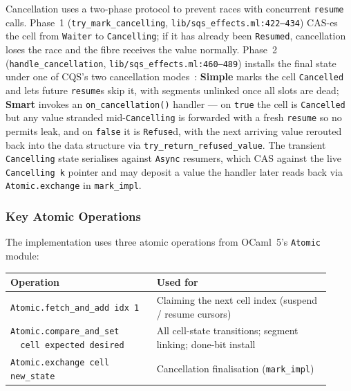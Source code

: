 \documentclass[11pt,a4paper]{article}
\begin{document}
Cancellation uses a two-phase protocol to prevent races with concurrent
\texttt{resume} calls. Phase~1 (\texttt{try\_mark\_cancelling},
\texttt{lib/sqs\_effects.ml:422--434}) CAS-es the cell from
\texttt{Waiter} to \texttt{Cancelling}; if it has already been
\texttt{Resumed}, cancellation loses the race and the fibre receives
the value normally. Phase~2 (\texttt{handle\_cancellation},
\texttt{lib/sqs\_effects.ml:460--489}) installs the final state under
one of CQS's two cancellation modes~\cite{koval2023cqs}: \textbf{Simple}
marks the cell \texttt{Cancelled} and lets future \texttt{resume}s skip
it, with segments unlinked once all slots are dead; \textbf{Smart}
invokes an \texttt{on\_cancellation()} handler --- on \texttt{true} the
cell is \texttt{Cancelled} but any value stranded mid-\texttt{Cancelling}
is forwarded with a fresh \texttt{resume} so no permits leak, and on
\texttt{false} it is \texttt{Refuse}d, with the next arriving value
rerouted back into the data structure via
\texttt{try\_return\_refused\_value}. The transient \texttt{Cancelling}
state serialises against \texttt{Async} resumers, which CAS against the
live \texttt{Cancelling~k} pointer and may deposit a value the handler
later reads back via \texttt{Atomic.exchange} in \texttt{mark\_impl}.

\subsubsection{Key Atomic Operations}
\label{sec:impl-atomics}

The implementation uses three atomic operations from OCaml~5's
\texttt{Atomic} module:

\begin{center}\small
\begin{tabular}{@{}p{0.42\linewidth}p{0.50\linewidth}@{}}
\toprule
\textbf{Operation} & \textbf{Used for} \\
\midrule
\texttt{Atomic.fetch\_and\_add idx 1}
  & Claiming the next cell index (suspend / resume cursors) \\
\texttt{Atomic.compare\_and\_set} \newline
\texttt{\ \ cell expected desired}
  & All cell-state transitions; segment linking; done-bit install \\
\texttt{Atomic.exchange cell new\_state}
  & Cancellation finalisation (\texttt{mark\_impl}) \\
\bottomrule
\end{tabular}
\end{center}
\end{document}
